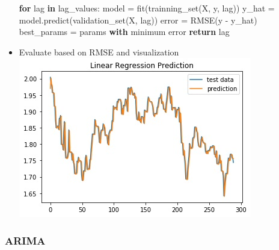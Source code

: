 \documentclass[11pt]{article}
\makeatletter
\def\maxwidth{\ifdim\Gin@nat@width>\linewidth\linewidth
    \else\Gin@nat@width\fi}
\let\Oldincludegraphics\includegraphics
\renewcommand{\includegraphics}[1]{\Oldincludegraphics[width=.8\maxwidth]{#1}}
\newenvironment{Shaded}{}{}
\newcommand{\KeywordTok}[1]{\textcolor[rgb]{0.00,0.44,0.13}{\textbf{{#1}}}}
\newcommand{\NormalTok}[1]{{#1}}
\newcommand{\ControlFlowTok}[1]{\textcolor[rgb]{0.00,0.44,0.13}{\textbf{{#1}}}}
\newcommand{\OperatorTok}[1]{\textcolor[rgb]{0.40,0.40,0.40}{{#1}}}
\makeatother
\begin{document}
\begin{itemize}
\begin{Shaded}
\begin{Highlighting}[]
\ControlFlowTok{for}\NormalTok{ lag }\KeywordTok{in}\NormalTok{ lag_values:}
\NormalTok{    model }\OperatorTok{=}\NormalTok{ fit(trainning_set(X, y, lag))}
\NormalTok{    y_hat }\OperatorTok{=}\NormalTok{ model.predict(validation_set(X, lag))}
\NormalTok{    error }\OperatorTok{=}\NormalTok{ RMSE(y }\OperatorTok{-}\NormalTok{ y_hat)}
\NormalTok{    best_params }\OperatorTok{=}\NormalTok{ params }\ControlFlowTok{with}\NormalTok{ minimum error}
\ControlFlowTok{return}\NormalTok{ lag}
\end{Highlighting}
\end{Shaded}
\item
  Evaluate based on RMSE and visualization\\
  \includegraphics{./figures/8.jpg}
\end{itemize}

\subsubsection{ARIMA}\label{arima}
\end{document}
